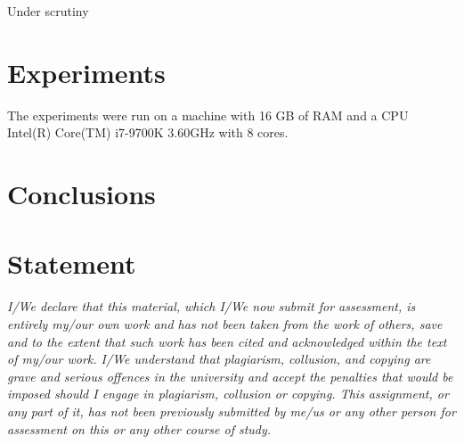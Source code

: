 \documentclass[runningheads]{llncs}
\begin{document}
Under scrutiny

\section{Experiments}
\label{sec:experiments}

The experiments were run on a machine with 16 GB of
RAM and a CPU Intel(R) Core(TM) i7-9700K 3.60GHz with 8 cores.



\section{Conclusions}
\label{sec:conclusions}

\section*{Statement}
\textit{I/We declare that this material, which I/We now submit for assessment, is entirely my/our own work and has not been taken from the work of others, save and to the extent that such work has been cited and acknowledged within the text of my/our work. I/We understand that plagiarism, collusion, and copying are grave and serious offences in the university and accept the penalties that would be imposed should I engage in plagiarism, collusion or copying. This assignment, or any part of it, has not been previously submitted by me/us or any other person for assessment on this or any other course of study.}




\end{document}

